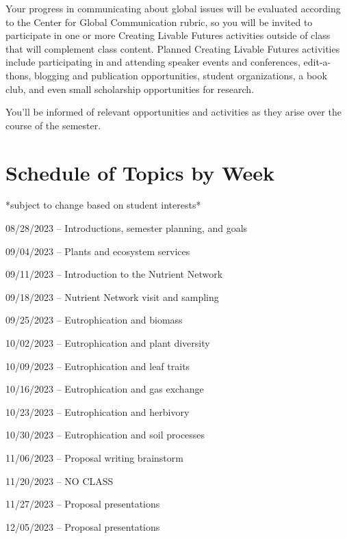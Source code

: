 \documentclass[12pt, notitlepage]{article}   	%
\begin{document}
{Your progress in communicating about global issues will be evaluated according to the 
Center for Global Communication rubric, so you will be invited to participate 
in one or more Creating Livable Futures activities outside of class that will 
complement class content. 
Planned Creating Livable Futures activities include participating in and attending 
speaker events and conferences, edit-a-thons, blogging and publication opportunities, 
student organizations, a book club, and even small scholarship opportunities for research. 

You’ll be informed of relevant opportunities and activities as they arise over 
the course of the semester.

\newpage

\section*{Schedule of Topics by Week}
*subject to change based on student interests* \par
08/28/2023 – Introductions, semester planning, and goals \par
09/04/2023 – Plants and ecosystem services \par
09/11/2023 – Introduction to the Nutrient Network \par
09/18/2023 – Nutrient Network visit and sampling \par
09/25/2023 – Eutrophication and biomass \par
10/02/2023 – Eutrophication and plant diversity \par
10/09/2023 – Eutrophication and leaf traits \par
10/16/2023 – Eutrophication and gas exchange \par
10/23/2023 – Eutrophication and herbivory \par
10/30/2023 – Eutrophication and soil processes \par
11/06/2023 – Proposal writing brainstorm \par
11/20/2023 – NO CLASS \par
11/27/2023 – Proposal presentations \par
12/05/2023 – Proposal presentations \par

} %
\end{document}
